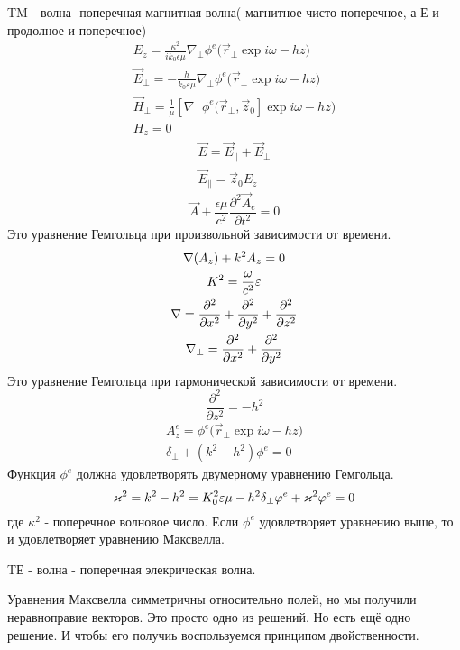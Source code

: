 TM - волна- поперечная магнитная волна( магнитное чисто поперечное, а Е и продолное и поперечное)
\begin{gather}
	E_z = \frac{\kappa^2}{i k_0 \epsilon \mu} \nabla_\perp \phi^e(\vec{r}_\perp \exp{i\omega - h z)}\\
	\vec{E}_\perp = - \frac{h}{k_0 \varepsilon \mu} \nabla_\perp \phi^e(\vec{r}_{\perp} \exp{i\omega - h z)} \\
%
	\vec{H}_\perp = \frac{1}{\mu} [\nabla_\perp \phi^e(\vec{r}_\perp, \vec{z}_0] \exp{i\omega - h z)}\\
	H_z = 0
\end{gather}
\begin{gather}
	\vec{E} = \vec{E}_\parallel + \vec{E}_\perp\\
	\vec{E}_\parallel = \vec{z}_0 E_z
\end{gather}
\begin{equation}
	\vec{A} + \frac{\epsilon \mu}{c^2} \frac{\partial^2\vec{A}_e}{\partial{t}^2} = 0
\end{equation}
Это уравнение Гемгольца при произвольной зависимости от времени.
\begin{gather}
	\nabla(A_z) + k^2 A_z = 0\\
	K^2 = \frac{\omega}{c^2} \varepsilon \\
	\nabla =  \pdv[2]{x} + \pdv[2]{y}+ \pdv[2]{z}\\
	\nabla_\perp =  \pdv[2]{x} + \pdv[2]{y}
\end{gather}
Это уравнение Гемгольца при гармонической зависимости от времени.
\begin{equation}
	\frac{\partial^2}{\partial{z}^2} = -h^2
\end{equation}
\begin{gather}
	A_z^e = \phi^e(\vec{r}_{\perp} \exp{i \omega - h z)}\\
	\delta_\perp + (k^2 - h^2) \phi^e = 0
\end{gather}
Функция $\phi^e$ должна удовлетворять двумерному уравнению Гемгольца.
\begin{equation}
	\kappa^2 = k^2 - h^2 = K_0^2 \varepsilon \mu - h^2\\
	\delta_\perp \phi^e + \kappa^2 \phi^e = 0
\end{equation}
где $\kappa^2$ - поперечное волновое число.
Если $\phi^e$ удовлетворяет уравнению выше, то и удовлетворяет уравнению Максвелла.

TЕ - волна - поперечная элекрическая волна.

Уравнения Максвелла симметричны относительно полей, но мы получили неравноправие векторов. Это просто одно из решений. Но есть ещё	одно решение. И чтобы его получиь воспользуемся принципом двойственности.

